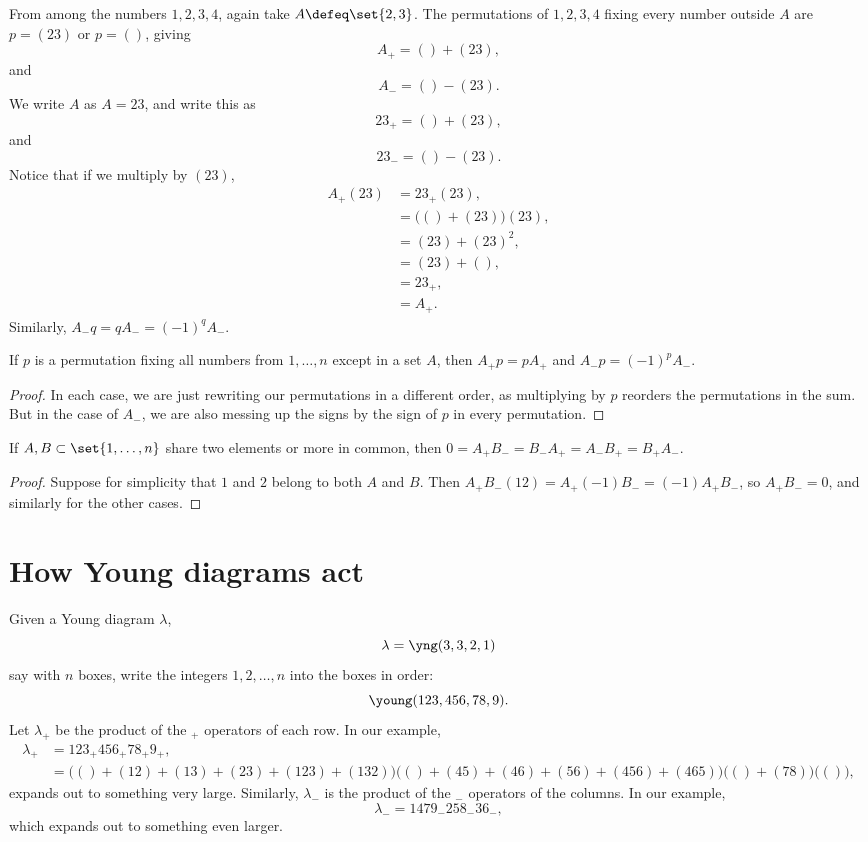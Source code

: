 \begin{example}
From among the numbers \(1,2,3,4\), again take \(A\defeq\set{2,3}\).
The permutations of \(1,2,3,4\) fixing every number outside \(A\) are \(p=(23)\) or \(p=()\), giving
\[
A_+ = () + (23),
\]
and
\[
A_- = () - (23).
\]
We write \(A\) as \(A=23\), and write this as
\[
23_+ = () + (23),
\]
and
\[
23_- = () - (23).
\]
Notice that if we multiply by \((23)\),
\begin{align*}
A_+ (23)
&=
23_+(23),
\\
&=
\big(()+(23)\big)(23),
\\
&=(23)+(23)^2,
\\
&=(23)+(),
\\
&=23_+,
\\
&=A_+.
\end{align*}
Similarly, \(A_-q=qA_-=(-1)^qA_-\).
\end{example}

\begin{lemma}
If \(p\) is a permutation fixing all numbers from \(1,\dots,n\) except in a set \(A\), then
\(A_+ p = p A_+\) and \(A_- p = (-1)^p A_-\).
\end{lemma}
\begin{proof}
In each case, we are just rewriting our permutations in a different order, as multiplying by \(p\) reorders the permutations in the sum.
But in the case of \(A_-\), we are also messing up the signs by the sign of \(p\) in every permutation.
\end{proof}

\begin{lemma}\label{lemma:two.in.common}
If \(A,B \subset \set{1,\dots,n}\) share two elements or more in common, then \(0=A_+ B_-=B_-A_+=A_-B_+=B_+A_-\).
\end{lemma}
\begin{proof}
Suppose for simplicity that \(1\) and \(2\) belong to both \(A\) and \(B\).
Then \(A_+B_-(12)=A_+(-1)B_-=(-1)A_+B_-\), so \(A_+B_-=0\), and similarly for the other cases.
\end{proof}

\section{How Young diagrams act}
Given a Young diagram \(\lambda\), 
\[
\lambda = \yng(3,3,2,1)
\]
say with \(n\) boxes, write the integers \(1,2,\dots,n\) into the boxes in order:
\[
\young(123,456,78,9).
\]
Let \(\lambda_+\) be the product of the \({}_+\) operators of each row.
In our example,
\begin{align*}
\lambda_+ 
&= 
123_+ 456_+ 78_+ 9_+,
\\
&=
\big(()+(12)+(13)+(23)+(123)+(132)\big)
\big(()+(45)+(46)+(56)+(456)+(465)\big)
\big(()+(78)\big)
\big(()\big),
\end{align*}
expands out to something very large.
Similarly, \(\lambda_-\) is the product of the \({}_-\) operators of the columns.
In our example,
\[
\lambda_-=1479_- 258_- 36_-,
\]
which expands out to something even larger.

